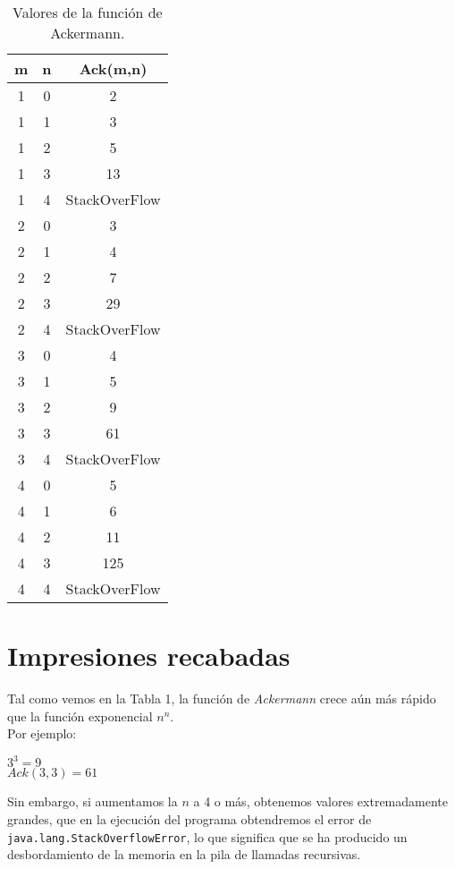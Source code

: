 \documentclass[12pt,letterpaper]{article}
\begin{document}
\begin{center}
\begin{table}[htbp]
	\begin{center}
		\begin{tabular}{|c|c|c|}
			\hline
			\textbf{m} & \textbf{n} & \textbf{Ack(m,n)}  \\
			\hline 
			1 & 0 & 2\\ \hline	
			1 & 1 & 3\\ \hline	
			1 & 2 & 5\\ \hline	
			1 & 3 & 13\\ \hline	
			1 & 4 & StackOverFlow\\ \hline	
			2 & 0 & 3\\ \hline	
			2 & 1 & 4\\ \hline	
			2 & 2 & 7\\ \hline	
			2 & 3 & 29\\ \hline	
			2 & 4 & StackOverFlow\\ \hline	
			3 & 0 & 4\\ \hline	
			3 & 1 & 5\\ \hline	
			3 & 2 & 9\\ \hline
			3 & 3 & 61\\ \hline
			3 & 4 & StackOverFlow\\ \hline
			4 & 0 & 5\\ \hline
			4 & 1 & 6\\ \hline
			4 & 2 & 11\\ \hline
			4 & 3 & 125\\ \hline
			4 & 4 & StackOverFlow\\ \hline
		\end{tabular}
		\caption{Valores de la función de Ackermann.}
		\label{tabla:Valores de la función de Ackermann}
	\end{center}
\end{table}
\end{center}

\section{Impresiones recabadas}

Tal como vemos en la Tabla 1, la función de \textit{Ackermann} crece aún más rápido que la función exponencial $n^n$.\\
Por ejemplo:
\begin{center}
	$3^3=9$\\
	$Ack(3,3)=61$
\end{center}

Sin embargo, si aumentamos la $n$ a 4 o más, obtenemos valores extremadamente grandes, que en la ejecución del programa obtendremos el error de \texttt{java.lang.StackOverflowError}, lo que significa que se ha producido un desbordamiento de la memoria en la pila de llamadas recursivas.
\end{document}
